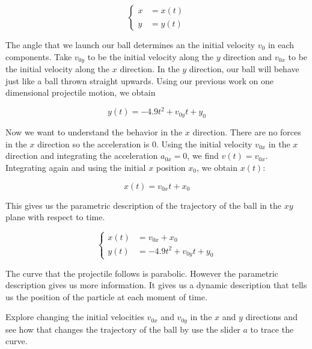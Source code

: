 \documentclass{ximera}
\begin{document}
\begin{example}
\begin{explanation}
\[
\begin{cases}
x&=x(t) \\
y&=y(t)
\end{cases}
\]

The angle that we launch our ball determines an the initial velocity $v_{0}$ in each components. Take $v_{0y}$ to be the initial velocity  along the $y$ direction and $v_{0x}$ to be the initial velocity along the $x$ direction. In the $y$ direction, our ball will behave just like a ball thrown straight upwards. Using our previous work on one dimensional projectile motion, we obtain

\[
y(t)=-4.9t^2+v_{0y}t+y_{0}
\]

Now we want to understand the behavior in the $x$ direction. There are no forces in the $x$ direction so the acceleration is $0$.   Using the initial velocity  $v_{0x}$ in the $x$ direction and integrating the acceleration $a_{0x}=0$, we find $v(t)=v_{0x}$.  Integrating again and using the initial $x$ position $x_{0}$, we obtain
$x(t)$:

\[
x(t)=v_{0x}t+x_{0}
\]

This gives us the parametric description of the trajectory of the ball in the $xy$ plane with respect to time.

\[
\begin{cases}
x(t)&=v_{0x}+x_{0}\\
y(t)&=-4.9t^2+v_{0y}t+y_{0}
\end{cases}
\]

The curve that the projectile follows is parabolic. However the parametric description gives us more information. It gives us a dynamic description that tells us the position of the particle at each moment of time.

\end{explanation}

\end{example}



\begin{onlineOnly}



Explore changing the initial velocities $v_{0x}$ and $v_{0y}$  in the $x$ and $y$ directions and see how that changes the trajectory of the ball by use the slider $a$ to trace the curve.
\end{onlineOnly}
\end{document}
